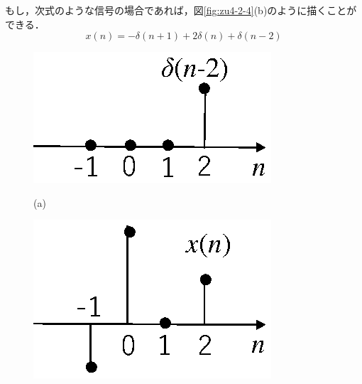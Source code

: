 もし，次式のような信号の場合であれば，図\ref{fig:zu4-2-4}(b)のように描くことができる．
\begin{equation}
x(n)=-\delta(n+1)+2\delta(n)+\delta(n-2)
\label{eqn:eqn-2-6}
\end{equation}

\begin{figure}[H]
\begin{center}
\begin{minipage}{.3\textwidth}
\begin{center}
\includegraphics[width=.95\textwidth]{fig/zu-2-3-a.eps}

(a)
\end{center}
\end{minipage}
\begin{minipage}{.3\textwidth}
\begin{center}
\includegraphics[width=.95\textwidth]{fig/zu-2-3-b.eps}


\end{center}
\end{minipage}
\end{center}
\end{figure}
